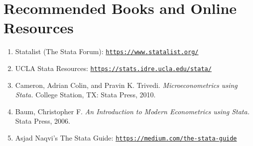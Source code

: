 \documentclass[11pt]{article}
\begin{document}

\section*{Recommended Books and Online Resources}
\begin{enumerate}
\setlength\itemsep{-0.5em}
\item Statalist (The Stata Forum): \href{https://www.statalist.org/}{{\nolinkurl{https://www.statalist.org/}}}
\item UCLA Stata Resources: \href{https://stats.idre.ucla.edu/stata/ }{{\nolinkurl{https://stats.idre.ucla.edu/stata/}}} 
\item Cameron, Adrian Colin, and Pravin K. Trivedi.  \emph{Microeconometrics using Stata. }College Station, TX: Stata Press,  2010.
\item Baum, Christopher F.  \emph{An Introduction to Modern Econometrics using Stata.} Stata Press,  2006.
\item Asjad Naqvi's The Stata Guide: \href{https://medium.com/the-stata-guide}{{\nolinkurl{https://medium.com/the-stata-guide}}}
\end{enumerate}
\end{document}

